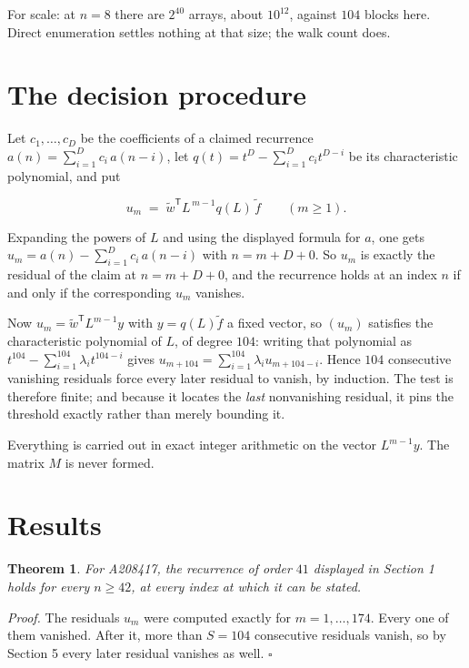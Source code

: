 \documentclass[11pt]{article}
\newtheorem{theorem}{Theorem}
\theoremstyle{definition}
\begin{document}
For scale: at $n = 8$ there are $2^{40}$ arrays, about $10^{12}$, against $104$ blocks here. Direct enumeration settles nothing at that size; the walk count does.

\section{The decision procedure}

Let $c_1,\dots,c_D$ be the coefficients of a claimed recurrence $a(n) = \sum_{i=1}^{D} c_i\,a(n-i)$, let $q(t) = t^{D} - \sum_{i=1}^{D} c_i t^{D-i}$ be its characteristic polynomial, and put

\[u_m \;=\; \tilde w^{\mathsf T} L^{\,m-1} q(L)\,\tilde f \qquad (m \ge 1).\]

Expanding the powers of $L$ and using the displayed formula for $a$, one gets $u_m = a(n) - \sum_{i=1}^{D} c_i\,a(n-i)$ with $n = m + D + 0$. So $u_m$ is exactly the residual of the claim at $n = m + D + 0$, and the recurrence holds at an index $n$ if and only if the corresponding $u_m$ vanishes.

Now $u_m = \tilde w^{\mathsf T} L^{m-1} y$ with $y = q(L)\tilde f$ a fixed vector, so $(u_m)$ satisfies the characteristic polynomial of $L$, of degree $104$: writing that polynomial as $t^{104} - \sum_{i=1}^{104} \lambda_i t^{104-i}$ gives $u_{m+104} = \sum_{i=1}^{104} \lambda_i u_{m+104-i}$. Hence $104$ consecutive vanishing residuals force every later residual to vanish, by induction. The test is therefore finite; and because it locates the {\itshape last} nonvanishing residual, it pins the threshold exactly rather than merely bounding it.

Everything is carried out in exact integer arithmetic on the vector $L^{m-1}y$. The matrix $M$ is never formed.

\section{Results}

\begin{theorem} For A208417, the recurrence of order $41$ displayed in Section 1 holds for every $n \ge 42$, at every index at which it can be stated.\end{theorem}

{\itshape Proof.} The residuals $u_m$ were computed exactly for $m = 1,\dots,174$. Every one of them vanished. After it, more than $S = 104$ consecutive residuals vanish, so by Section 5 every later residual vanishes as well. $\square$
\end{document}
